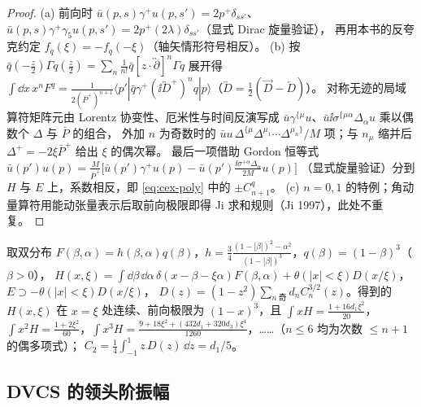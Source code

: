\begin{proof}
(a) 前向时 $\bar u(p,s)\gamma^+u(p,s')=2p^+\delta_{ss'}$、$\bar u(p,s)\gamma^+\gamma_5u(p,s')=2p^+(2\lambda)\delta_{ss'}$（显式 Dirac 旋量验证），
再用本书的反夸克约定 $f_{\bar q}(\xi)=-f_q(-\xi)$（轴矢情形符号相反）。
(b) 按 $\bar q(-\frac z2)\Gamma q(\frac z2)=\sum_n\frac{1}{n!}\bar q[z\cdot\overleftrightarrow\partial]^n\Gamma q$ 展开得
$\int\dd x\,x^nF^q=\frac{1}{2(\bar P^+)^{n+1}}\langle p'|\bar q\gamma^+(\ii\overleftrightarrow D^+)^nq|p\rangle$（$\overleftrightarrow D=\frac12(\overrightarrow D-\overleftarrow D)$）。
对称无迹的局域算符矩阵元由 Lorentz 协变性、厄米性与时间反演写成 $\bar u\gamma^{\{\mu}u$、$\bar u\ii\sigma^{\{\mu\alpha}\Delta_\alpha u$ 乘以偶数个 $\Delta$ 与 $\bar P$ 的组合，
外加 $n$ 为奇数时的 $\bar uu\,\Delta^{\{\mu}\Delta^{\mu_1}\cdots\Delta^{\mu_n\}}/M$ 项；与 $n_\mu$ 缩并后 $\Delta^+=-2\xi\bar P^+$ 给出 $\xi$ 的偶次幂。
最后一项借助 Gordon 恒等式
$\bar u(p')u(p)=\frac{M}{\bar P^+}\big[\bar u(p')\gamma^+u(p)-\bar u(p')\frac{\ii\sigma^{+\alpha}\Delta_\alpha}{2M}u(p)\big]$
（显式旋量验证）分到 $H$ 与 $E$ 上，系数相反，即 \cref{eq:cex-poly} 中的 $\pm C^q_{n+1}$。
(c) $n=0,1$ 的特例；角动量算符用能动张量表示后取前向极限即得 Ji 求和规则（Ji 1997），此处不重复。
\end{proof}

\begin{example}[双分布模型中的检验]\label{ex:cex-dd}
取双分布 $F(\beta,\alpha)=h(\beta,\alpha)q(\beta)$，$h=\frac34\frac{(1-|\beta|)^2-\alpha^2}{(1-|\beta|)^3}$，$q(\beta)=(1-\beta)^3$（$\beta>0$），
$H(x,\xi)=\int\dd\beta\,\dd\alpha\,\delta(x-\beta-\xi\alpha)F(\beta,\alpha)+\theta(|x|<\xi)D(x/\xi)$，$E\supset-\theta(|x|<\xi)D(x/\xi)$，
$D(z)=(1-z^2)\sum_{n\ \text{奇}}d_nC^{3/2}_n(z)$。得到的 $H(x,\xi)$ 在 $x=\xi$ 处连续、前向极限为 $(1-x)^3$，且
$\int xH=\frac{1+16d_1\xi^2}{20}$，$\int x^2H=\frac{1+2\xi^2}{60}$，$\int x^3H=\frac{9+18\xi^2+(432d_1+320d_3)\xi^4}{1260}$，……（$n\le6$ 均为次数 $\le n+1$ 的偶多项式）；
$C_2=\frac14\int_{-1}^1z\,D(z)\,\dd z=d_1/5$。
\end{example}

\subsection{DVCS 的领头阶振幅}

